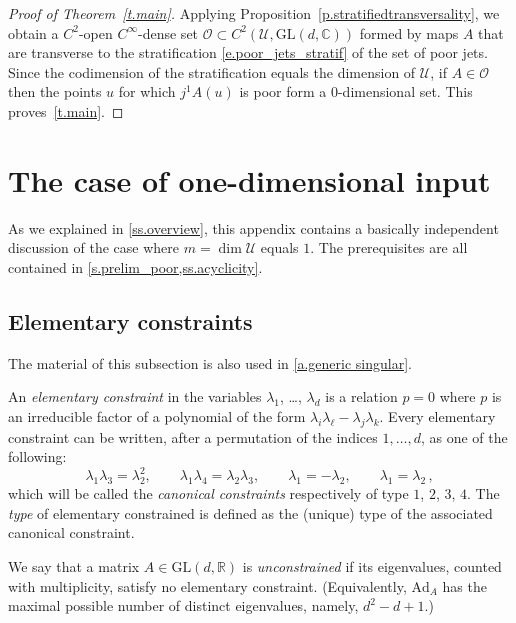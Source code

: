 \documentclass[10pt, a4paper]{amsart}
\theoremstyle{plain}
\theoremstyle{definition}
\theoremstyle{remark}
\theoremstyle{note}
\numberwithin{equation}{section}
\begin{document}
\begin{proof}[Proof of Theorem~\ref{t.main}]
Applying Proposition~\ref{p.stratifiedtransversality}, we obtain a $C^2$-open
$C^\infty$-dense set ${\mathcal{O}} \subset C^2({\mathcal{U}},{\mathrm{GL}}(d,{\mathbb{C}}))$ formed by maps $A$ 
that are transverse to the stratification \eqref{e.poor_jets_stratif} 
of the set of poor jets.
Since the codimension of the stratification equals the dimension of ${\mathcal{U}}$,
if $A \in {\mathcal{O}}$ then the points $u$ for which $j^1 A(u)$ is poor form a $0$-dimensional set.
This proves~\cref{t.main}.
\end{proof}

\appendix  

\section{The case of one-dimensional input}\label{a.dim 1}

As we explained in \cref{ss.overview},
this appendix contains a basically independent discussion of the case where $m = \dim {\mathcal{U}}$ equals $1$.
The prerequisites are all contained in \cref{s.prelim_poor,ss.acyclicity}. 

\medskip

\subsection{Elementary constraints}\label{ss.unconstrained}
The material of this subsection is also used in \cref{a.generic singular}.

\medskip

An \emph{elementary constraint} in the variables $\lambda_1$, \dots, $\lambda_d$ 
is a relation $p=0$ where
$p$ is an irreducible factor of a polynomial 
of the form $\lambda_i \lambda_\ell - \lambda_j \lambda_k$.
Every elementary constraint can be written, after a permutation of the indices $1,\dots,d$, 
as one of the following:
\begin{equation}\label{e.canonical_constr}
\lambda_1 \lambda_3 = \lambda_2^2 , \qquad
\lambda_1 \lambda_4 = \lambda_2 \lambda_3, \qquad  
\lambda_1 = -\lambda_2, \qquad 
\lambda_1 = \lambda_2 \, ,
\end{equation}
which will be called the \emph{canonical constraints} respectively of type $1$, $2$, $3$, $4$.
The \emph{type} of elementary constrained is defined as 
the (unique) type of the associated canonical constraint.

We say that a matrix $A\in {\mathrm{GL}}(d,{\mathbb{R}})$ is \emph{unconstrained} if its eigenvalues, counted with multiplicity, satisfy no elementary constraint.
(Equivalently, ${\mathrm{Ad}}_A$ has the maximal possible number of distinct eigenvalues, namely, $d^2-d+1$.)
 
\end{document}
